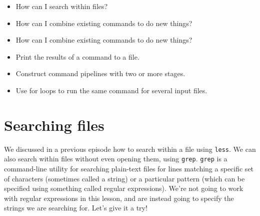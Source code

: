 \documentclass[
  letterpaper,
  DIV=11,
  numbers=noendperiod]{scrreprt}
\providecommand{\tightlist}{%
  \setlength{\itemsep}{0pt}\setlength{\parskip}{0pt}}\usepackage{longtable,booktabs,array}
\begin{document}
\begin{tcolorbox}[enhanced jigsaw, opacitybacktitle=0.6, colback=white, coltitle=black, opacityback=0, rightrule=.15mm, toptitle=1mm, toprule=.15mm, bottomtitle=1mm, colframe=quarto-callout-tip-color-frame, arc=.35mm, titlerule=0mm, colbacktitle=quarto-callout-tip-color!10!white, leftrule=.75mm, title={🤔 Questions}, breakable, bottomrule=.15mm, left=2mm]

\begin{itemize}
\tightlist
\item
  How can I search within files?
\item
  How can I combine existing commands to do new things?
\end{itemize}

\end{tcolorbox}

\begin{tcolorbox}[enhanced jigsaw, opacitybacktitle=0.6, colback=white, coltitle=black, opacityback=0, rightrule=.15mm, toptitle=1mm, toprule=.15mm, bottomtitle=1mm, colframe=quarto-callout-important-color-frame, arc=.35mm, titlerule=0mm, colbacktitle=quarto-callout-important-color!10!white, leftrule=.75mm, title={🎯 Objectives}, breakable, bottomrule=.15mm, left=2mm]

\begin{itemize}
\tightlist
\item
  How can I combine existing commands to do new things?
\item
  Print the results of a command to a file.
\item
  Construct command pipelines with two or more stages.
\item
  Use for loops to run the same command for several input files.
\end{itemize}

\end{tcolorbox}

\section{Searching files}\label{searching-files}

We discussed in a previous episode how to search within a file using
\texttt{less}. We can also search within files without even opening
them, using \texttt{grep}. \texttt{grep} is a command-line utility for
searching plain-text files for lines matching a specific set of
characters (sometimes called a string) or a particular pattern (which
can be specified using something called regular expressions). We're not
going to work with regular expressions in this lesson, and are instead
going to specify the strings we are searching for. Let's give it a try!
\end{document}
